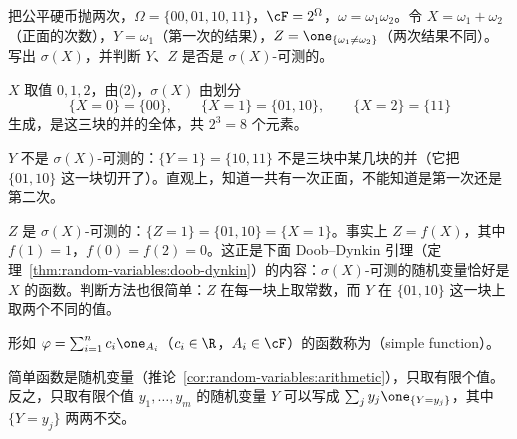 \begin{workedexample}\label{we:random-variables:sigma-sum}
把公平硬币抛两次，$\Omega=\{00,01,10,11\}$，$\cF=2^\Omega$，$\omega=\omega_1\omega_2$。令 $X=\omega_1+\omega_2$（正面的次数），$Y=\omega_1$（第一次的结果），$Z=\one_{\{\omega_1\neq\omega_2\}}$（两次结果不同）。写出 $\sigma(X)$，并判断 $Y$、$Z$ 是否是 $\sigma(X)$-可测的。
\end{workedexample}
\begin{solution}
$X$ 取值 $0,1,2$，由(2)，$\sigma(X)$ 由划分
\[
\{X=0\}=\{00\},\qquad\{X=1\}=\{01,10\},\qquad\{X=2\}=\{11\}
\]
生成，是这三块的并的全体，共 $2^3=8$ 个元素。

$Y$ 不是 $\sigma(X)$-可测的：$\{Y=1\}=\{10,11\}$ 不是三块中某几块的并（它把 $\{01,10\}$ 这一块切开了）。直观上，知道一共有一次正面，不能知道是第一次还是第二次。

$Z$ 是 $\sigma(X)$-可测的：$\{Z=1\}=\{01,10\}=\{X=1\}$。事实上 $Z=f(X)$，其中 $f(1)=1$，$f(0)=f(2)=0$。这正是下面 Doob--Dynkin 引理（定理~\ref{thm:random-variables:doob-dynkin}）的内容：$\sigma(X)$-可测的随机变量恰好是 $X$ 的函数。判断方法也很简单：$Z$ 在每一块上取常数，而 $Y$ 在 $\{01,10\}$ 这一块上取两个不同的值。
\end{solution}


\begin{definition}[简单函数]\label{def:random-variables:simple}
形如 $\varphi=\sum_{i=1}^nc_i\one_{A_i}$（$c_i\in\R$，$A_i\in\cF$）的函数称为（simple function）。
\end{definition}

简单函数是随机变量（推论~\ref{cor:random-variables:arithmetic}），只取有限个值。反之，只取有限个值 $y_1,\dots,y_m$ 的随机变量 $Y$ 可以写成 $\sum_jy_j\one_{\{Y=y_j\}}$，其中 $\{Y=y_j\}$ 两两不交。

